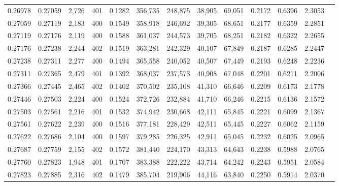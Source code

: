 \begin{tabular}{rrrrrrrrrrrrr}
0.26978 & 0.27059 &  2,726 & 401 &                                     0.1282 & 356,735 & 248,875 &  38,905 &  69,051 & 0.2172 & 0.6396 & 2.3053 \\
0.27059 & 0.27119 &  2,183 & 400 &                                     0.1549 & 358,918 & 246,692 &  39,305 &  68,651 & 0.2177 & 0.6359 & 2.2851 \\
0.27119 & 0.27176 &  2,119 & 400 &                                     0.1588 & 361,037 & 244,573 &  39,705 &  68,251 & 0.2182 & 0.6322 & 2.2655 \\
0.27176 & 0.27238 &  2,244 & 402 &                                     0.1519 & 363,281 & 242,329 &  40,107 &  67,849 & 0.2187 & 0.6285 & 2.2447 \\
0.27238 & 0.27311 &  2,277 & 400 &                                     0.1494 & 365,558 & 240,052 &  40,507 &  67,449 & 0.2193 & 0.6248 & 2.2236 \\
0.27311 & 0.27365 &  2,479 & 401 &                                     0.1392 & 368,037 & 237,573 &  40,908 &  67,048 & 0.2201 & 0.6211 & 2.2006 \\
0.27366 & 0.27445 &  2,465 & 402 &                                     0.1402 & 370,502 & 235,108 &  41,310 &  66,646 & 0.2209 & 0.6173 & 2.1778 \\
0.27446 & 0.27503 &  2,224 & 400 &                                     0.1524 & 372,726 & 232,884 &  41,710 &  66,246 & 0.2215 & 0.6136 & 2.1572 \\
0.27503 & 0.27561 &  2,216 & 401 &                                     0.1532 & 374,942 & 230,668 &  42,111 &  65,845 & 0.2221 & 0.6099 & 2.1367 \\
0.27561 & 0.27622 &  2,239 & 400 &                                     0.1516 & 377,181 & 228,429 &  42,511 &  65,445 & 0.2227 & 0.6062 & 2.1159 \\
0.27622 & 0.27686 &  2,104 & 400 &                                     0.1597 & 379,285 & 226,325 &  42,911 &  65,045 & 0.2232 & 0.6025 & 2.0965 \\
0.27687 & 0.27759 &  2,155 & 402 &                                     0.1572 & 381,440 & 224,170 &  43,313 &  64,643 & 0.2238 & 0.5988 & 2.0765 \\
0.27760 & 0.27823 &  1,948 & 401 &                                     0.1707 & 383,388 & 222,222 &  43,714 &  64,242 & 0.2243 & 0.5951 & 2.0584 \\
0.27823 & 0.27885 &  2,316 & 402 &                                     0.1479 & 385,704 & 219,906 &  44,116 &  63,840 & 0.2250 & 0.5914 & 2.0370 \\

\end{tabular}
